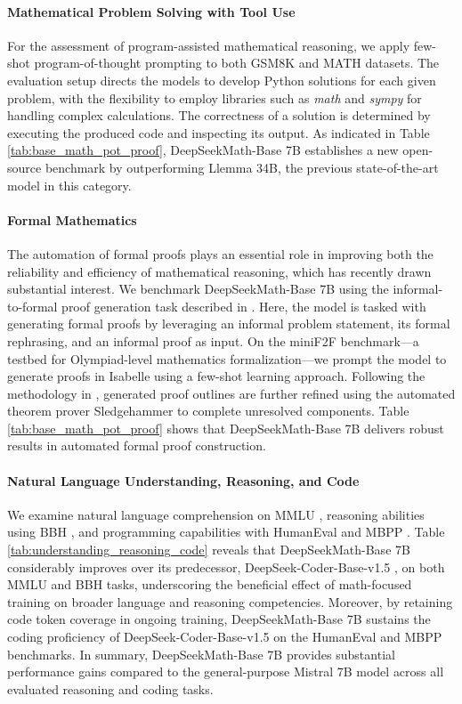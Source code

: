 \paragraph{Mathematical Problem Solving with Tool Use} For the assessment of program-assisted mathematical reasoning, we apply few-shot program-of-thought prompting \citep{pot,pal} to both GSM8K and MATH datasets. The evaluation setup directs the models to develop Python solutions for each given problem, with the flexibility to employ libraries such as \textit{math} and \textit{sympy} for handling complex calculations. The correctness of a solution is determined by executing the produced code and inspecting its output. As indicated in Table \ref{tab:base_math_pot_proof}, DeepSeekMath-Base 7B establishes a new open-source benchmark by outperforming Llemma 34B, the previous state-of-the-art model in this category.

\paragraph{Formal Mathematics}

The automation of formal proofs plays an essential role in improving both the reliability and efficiency of mathematical reasoning, which has recently drawn substantial interest. We benchmark DeepSeekMath-Base 7B using the informal-to-formal proof generation task described in \citep{dsp_proof}. Here, the model is tasked with generating formal proofs by leveraging an informal problem statement, its formal rephrasing, and an informal proof as input. On the miniF2F \citep{minif2f} benchmark—a testbed for Olympiad-level mathematics formalization—we prompt the model to generate proofs in Isabelle using a few-shot learning approach. Following the methodology in \cite{dsp_proof}, generated proof outlines are further refined using the automated theorem prover Sledgehammer \citep{sledgehammer} to complete unresolved components. Table \ref{tab:base_math_pot_proof} shows that DeepSeekMath-Base 7B delivers robust results in automated formal proof construction.

\paragraph{Natural Language Understanding, Reasoning, and Code}

We examine natural language comprehension on MMLU \citep{mmlu}, reasoning abilities using BBH \citep{bbh}, and programming capabilities with HumanEval \citep{codex} and MBPP \citep{mbpp}. Table \ref{tab:understanding_reasoning_code} reveals that DeepSeekMath-Base 7B considerably improves over its predecessor, DeepSeek-Coder-Base-v1.5 \citep{deepseek-coder}, on both MMLU and BBH tasks, underscoring the beneficial effect of math-focused training on broader language and reasoning competencies. Moreover, by retaining code token coverage in ongoing training, DeepSeekMath-Base 7B sustains the coding proficiency of DeepSeek-Coder-Base-v1.5 on the HumanEval and MBPP benchmarks. In summary, DeepSeekMath-Base 7B provides substantial performance gains compared to the general-purpose Mistral 7B model \citep{mistral} across all evaluated reasoning and coding tasks.

